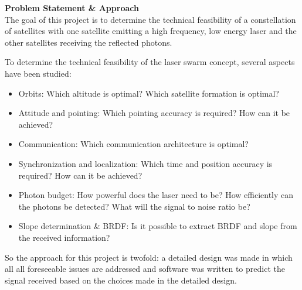 \textbf{Problem Statement \& Approach}\\
The goal of this project is to determine the technical feasibility of a constellation of satellites with one satellite emitting a high frequency, low energy laser and the other satellites receiving the reflected photons.

To determine the technical feasibility of the laser swarm concept, several aspects have been studied:

\begin{itemize}
\item Orbits: Which altitude is optimal? Which satellite formation is optimal?
\item Attitude and pointing: Which pointing accuracy is required? How can it be achieved?
\item Communication: Which communication architecture is optimal?
\item Synchronization and localization: Which time and position accuracy is required? How can it be achieved?
\item Photon budget: How powerful does the laser need to be? How efficiently can the photons be detected? What will the signal to noise ratio be?
\item Slope determination \& BRDF: Is it possible to extract BRDF and slope from the received information?
\end{itemize}

So the approach for this project is twofold: a detailed design was made in which all all foreseeable issues are addressed and software was written to predict the signal received based on the choices made in the detailed design.